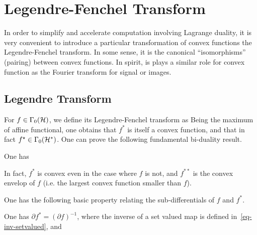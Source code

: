\section{Legendre-Fenchel Transform}

In order to simplify and accelerate computation involving Lagrange duality, it is very convenient to introduce a particular transformation of convex functions the Legendre-Fenchel transform. In some sense, it is the canonical ``isomorphisms'' (pairing) between convex functions. In spirit, is plays a similar role for convex function as the Fourier transform for signal or images. 

\subsection{Legendre Transform}

For $f \in \Gamma_0(\mathcal{H})$, we define its Legendre-Fenchel transform as
Being the maximum of affine functional, one obtains that $f^*$ is itself a convex function, and that in fact $f^\star \in \Gamma_0(\mathcal{H}^*)$. One can prove the following fundamental bi-duality result.

\begin{thm}
One has
\end{thm}

In fact, $f^*$ is convex even in the case where $f$ is not, and $f^{**}$ is the convex envelop of $f$ (i.e. the largest convex function smaller than $f$). 


One has the following basic property relating the sub-differentials of $f$ and $f^*$.

\begin{prop}
One has $\partial f^* = (\partial f)^{-1}$, where the inverse of a set valued map is defined in~\eqref{eq-inv-setvalued}, and 
\end{prop}

